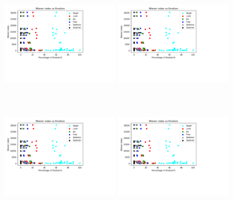\documentclass[acmtog]{acmart}
\begin{document}
\begin{figure}[h]
  \begin{minipage}{.33\textwidth}
    \centering
    \includegraphics[width=5cm,height=5cm,keepaspectratio]{WAnger.pdf}
  \end{minipage}%
  \begin{minipage}{.33\textwidth}
    \centering
    \includegraphics[width=5cm,height=5cm,keepaspectratio]{WAnger.pdf}
  \end{minipage}%
  \begin{minipage}{.33\textwidth}
    \centering
    \includegraphics[width=5cm,height=5cm,keepaspectratio]{WAnger.pdf}
  \end{minipage}
 \medskip
  \begin{minipage}{.33\textwidth}
    \centering
    \includegraphics[width=5cm,height=5cm,keepaspectratio]{WAnger.pdf}

\end{minipage}
\end{figure}
\end{document}
